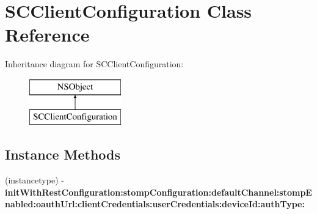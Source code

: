 \hypertarget{interface_s_c_client_configuration}{}\section{S\+C\+Client\+Configuration Class Reference}
\label{interface_s_c_client_configuration}
Inheritance diagram for S\+C\+Client\+Configuration\+:\begin{figure}[H]
\begin{center}
\leavevmode
\includegraphics[height=2.000000cm]{interface_s_c_client_configuration}
\end{center}
\end{figure}
\subsection*{Instance Methods}
\begin{DoxyCompactItemize}
\item 
(instancetype) -\/ {\bfseries init\+With\+Rest\+Configuration\+:stomp\+Configuration\+:default\+Channel\+:stomp\+Enabled\+:oauth\+Url\+:client\+Credentials\+:user\+Credentials\+:device\+Id\+:auth\+Type\+:}\hypertarget{interface_s_c_client_configuration_a8679fc689e0c73a7ec16dd340efd104c}{}\label{interface_s_c_client_configuration_a8679fc689e0c73a7ec16dd340efd104c}

\end{DoxyCompactItemize}

